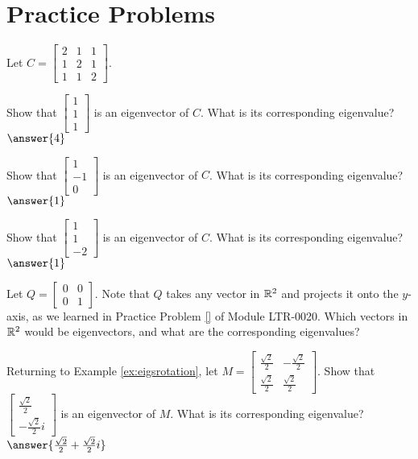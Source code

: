 \documentclass{ximera}
\begin{document}
\section*{Practice Problems}

\begin{problem}Let $C=\begin{bmatrix} 2 & 1 & 1\\ 1 & 2 & 1\\ 1 & 1 & 2\end{bmatrix}$.  \begin{problem}\label{prob:checkeig1}
Show that $\begin{bmatrix} 1\\1\\1 \end{bmatrix}$ is an eigenvector of $C$.  What is its corresponding eigenvalue?
$\answer{4}$
\end{problem}
 \begin{problem}\label{prob:checkeig2}
Show that $\begin{bmatrix} 1\\-1\\0 \end{bmatrix}$ is an eigenvector of $C$.  What is its corresponding eigenvalue?
$\answer{1}$
\end{problem}
 \begin{problem}\label{prob:checkeig3}
Show that $\begin{bmatrix} 1\\1\\-2 \end{bmatrix}$ is an eigenvector of $C$.  What is its corresponding eigenvalue?
$\answer{1}$
\end{problem}
\end{problem}



\begin{problem}\label{prob:eigprojmatrix} Let $Q=\begin{bmatrix} 0& 0\\ 0&1\end{bmatrix}$.  Note that $Q$ takes any vector in $\mathbb{R}^2$ and projects it onto the $y$-axis, as we learned in Practice Problem \ref{} of Module LTR-0020.  Which vectors in $\mathbb{R}^2$ would be eigenvectors, and what are the corresponding eigenvalues?
\end{problem}

 
\begin{problem}\label{ex:eigsrotation2}
Returning to Example \ref{ex:eigsrotation}, let $M=\begin{bmatrix}
\frac{\sqrt{2}}{2} & -\frac{\sqrt{2}}{2}\\
\frac{\sqrt{2}}{2} & \frac{\sqrt{2}}{2}
\end{bmatrix}$.  Show that $\begin{bmatrix} \frac{\sqrt{2}}{2}\\ -\frac{\sqrt{2}}{2} i \end{bmatrix}$ is an eigenvector of $M$.  What is its corresponding eigenvalue?
$\answer{\frac{\sqrt{2}}{2}+\frac{\sqrt{2}}{2}i}$
\end{problem}
\end{document}
